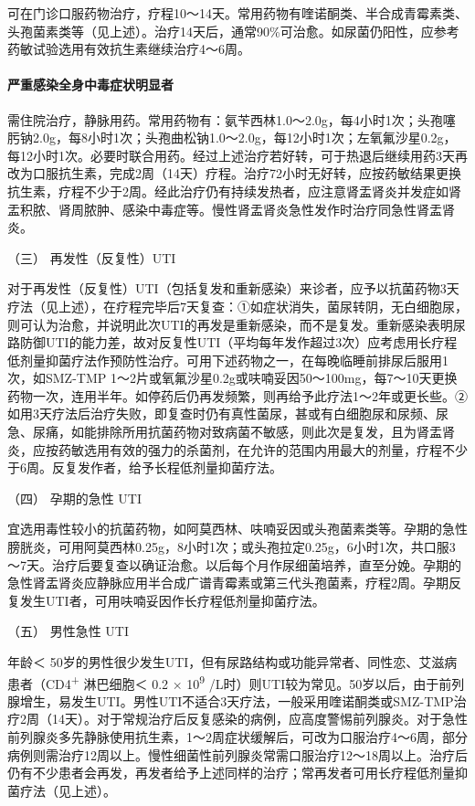 可在门诊口服药物治疗，疗程10～14天。常用药物有喹诺酮类、半合成青霉素类、头孢菌素类等（见上述）。治疗14天后，通常90\%可治愈。如尿菌仍阳性，应参考药敏试验选用有效抗生素继续治疗4～6周。

\paragraph{严重感染全身中毒症状明显者}

需住院治疗，静脉用药。常用药物有：氨苄西林1.0～2.0g，每4小时1次；头孢噻肟钠2.0g，每8小时1次；头孢曲松钠1.0～2.0g，每12小时1次；左氧氟沙星0.2g，每12小时1次。必要时联合用药。经过上述治疗若好转，可于热退后继续用药3天再改为口服抗生素，完成2周（14天）疗程。治疗72小时无好转，应按药敏结果更换抗生素，疗程不少于2周。经此治疗仍有持续发热者，应注意肾盂肾炎并发症如肾盂积脓、肾周脓肿、感染中毒症等。慢性肾盂肾炎急性发作时治疗同急性肾盂肾炎。

\hypertarget{text00345.htmlux5cux23CHP13-6-3-2-3}{}
（三） 再发性（反复性）UTI

对于再发性（反复性）UTI（包括复发和重新感染）来诊者，应予以抗菌药物3天疗法（见上述），在疗程完毕后7天复查：①如症状消失，菌尿转阴，无白细胞尿，则可认为治愈，并说明此次UTI的再发是重新感染，而不是复发。重新感染表明尿路防御UTI的能力差，故对反复性UTI（平均每年发作超过3次）应考虑用长疗程低剂量抑菌疗法作预防性治疗。可用下述药物之一，在每晚临睡前排尿后服用1次，如SMZ-TMP
1～2片或氧氟沙星0.2g或呋喃妥因50～100mg，每7～10天更换药物一次，连用半年。如停药后仍再发频繁，则再给予此疗法1～2年或更长些。②如用3天疗法后治疗失败，即复查时仍有真性菌尿，甚或有白细胞尿和尿频、尿急、尿痛，如能排除所用抗菌药物对致病菌不敏感，则此次是复发，且为肾盂肾炎，应按药敏选用有效的强力的杀菌剂，在允许的范围内用最大的剂量，疗程不少于6周。反复发作者，给予长程低剂量抑菌疗法。

\hypertarget{text00345.htmlux5cux23CHP13-6-3-2-4}{}
（四） 孕期的急性 UTI

宜选用毒性较小的抗菌药物，如阿莫西林、呋喃妥因或头孢菌素类等。孕期的急性膀胱炎，可用阿莫西林0.25g，8小时1次；或头孢拉定0.25g，6小时1次，共口服3～7天。治疗后要复查以确证治愈。以后每个月作尿细菌培养，直至分娩。孕期的急性肾盂肾炎应静脉应用半合成广谱青霉素或第三代头孢菌素，疗程2周。孕期反复发生UTI者，可用呋喃妥因作长疗程低剂量抑菌疗法。

\hypertarget{text00345.htmlux5cux23CHP13-6-3-2-5}{}
（五） 男性急性 UTI

年龄＜
50岁的男性很少发生UTI，但有尿路结构或功能异常者、同性恋、艾滋病患者（CD4\textsuperscript{+}
淋巴细胞＜ 0.2 × 10\textsuperscript{9}
/L时）则UTI较为常见。50岁以后，由于前列腺增生，易发生UTI。男性UTI不适合3天疗法，一般采用喹诺酮类或SMZ-TMP治疗2周（14天）。对于常规治疗后反复感染的病例，应高度警惕前列腺炎。对于急性前列腺炎多先静脉使用抗生素，1～2周症状缓解后，可改为口服治疗4～6周，部分病例则需治疗12周以上。慢性细菌性前列腺炎常需口服治疗12～18周以上。治疗后仍有不少患者会再发，再发者给予上述同样的治疗；常再发者可用长疗程低剂量抑菌疗法（见上述）。

